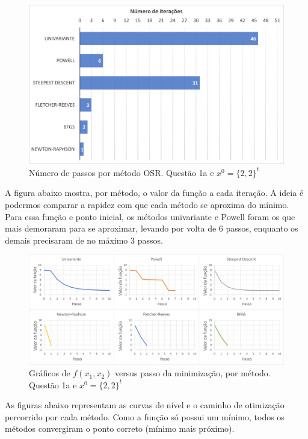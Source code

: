 \documentclass[10pt, a4paper]{article}
\begin{document}
\begin{figure}[H]
  \centering
  \includegraphics[scale=0.4]{figuras/q1a_passos_P1.PNG}
  \caption{Número de passos por método OSR. Questão 1a e $x^0 = \{2,2\}^t$ }
\end{figure}

\vspace{3mm}
A figura abaixo mostra, por método, o valor da função a cada iteração. A ideia é podermos comparar 
a rapidez com que cada método se aproxima do mínimo. Para essa função e ponto inicial, os métodos univariante e Powell
foram os que mais demoraram para se aproximar, levando por volta de 6 passos, enquanto os demais precisaram de no máximo
3 passos.

\begin{figure}[H]
  \centering
  \includegraphics[scale=0.45]{figuras/q1a_fxpassos_P1.PNG}
  \caption{Gráficos de $f(x_1,x_2)$ versus passo da minimização, por método. Questão 1a e $x^0 = \{2,2\}^t$}
\end{figure}

As figuras abaixo representam as curvas de nível e o caminho de otimização percorrido por cada método. Como a função 
só possui um mínimo, todos os métodos convergiram o ponto correto (mínimo mais próximo).
\end{document}
